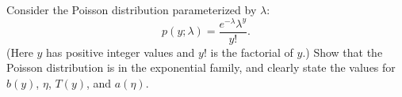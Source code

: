 \item {} Consider the Poisson distribution parameterized by
$\lambda$:
%
\begin{equation*}
  p(y; \lambda) = \frac{e^{-\lambda}\lambda^y}{y!}.
\end{equation*}
%
(Here $y$ has positive integer values and $y!$ is the factorial of $y$.) 
Show that the Poisson distribution is in the exponential family, and
clearly state the values for $b(y)$, $\eta$, $T(y)$, and $a(\eta)$.

